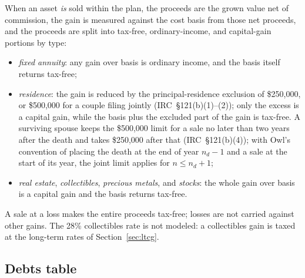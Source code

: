 \documentclass[fleqn,12pt]{report}
\begin{document}
When an asset \emph{is} sold within the plan, the proceeds are the grown value
net of commission, the gain is measured against the cost basis from those net
proceeds, and the proceeds are split into tax-free, ordinary-income, and
capital-gain portions by type:
\begin{itemize}[nosep]
  \item \textit{fixed annuity}: any gain over basis is ordinary income, and the
    basis itself returns tax-free;
  \item \textit{residence}: the gain is reduced by the principal-residence
    exclusion of \$250,000, or \$500,000 for a couple filing jointly
    (IRC~\S121(b)(1)--(2)); only the excess is a capital gain, while the basis
    plus the excluded part of the gain is tax-free.
    A surviving spouse keeps the \$500,000 limit for a sale no later than two
    years after the death and takes \$250,000 after that (IRC~\S121(b)(4)); with
    Owl's convention of placing the death at the end of year $n_d - 1$ and a sale
    at the start of its year, the joint limit applies for $n \le n_d + 1$;
  \item \textit{real estate}, \textit{collectibles}, \textit{precious metals}, and
    \textit{stocks}: the whole gain over basis is a capital gain and the basis
    returns tax-free.
\end{itemize}
A sale at a loss makes the entire proceeds tax-free; losses are not carried
against other gains.
The 28\% collectibles rate is not modeled: a collectibles gain is taxed at the
long-term rates of Section~\ref{sec:ltcg}.

\subsection*{Debts table}
\end{document}
